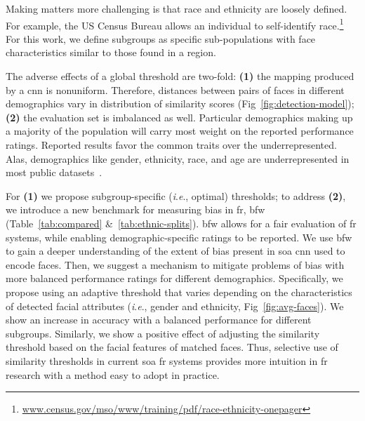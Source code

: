 \documentclass[10pt,twocolumn,letterpaper]{article}
\newcommand{\ie}{\textit{i}.\textit{e}., }
\begin{document}
\begin{table}[!t]
{{\begin{tabular}{r c c c c c c c c l}
        \bottomrule
    \end{tabular}}
    }
\end{table}

    
    Making matters more challenging is that race and ethnicity are loosely defined. For example, the US Census Bureau allows an individual to self-identify race.\footnote{\scriptsize\href{https://www.census.gov/mso/www/training/pdf/race-ethnicity-onepager.pdf}{www.census.gov/mso/www/training/pdf/race-ethnicity-onepager}} For this work, we define subgroups as specific sub-populations with face characteristics similar to those found in a region. 
    
    
    The adverse effects of a global threshold are two-fold: \textbf{(1)} the mapping produced by a \gls{cnn} is nonuniform. Therefore, distances between pairs of faces in different demographics vary in distribution of similarity scores (Fig~\ref{fig:detection-model}); \textbf{(2)} the evaluation set is imbalanced as well. Particular demographics making up a majority of the population will carry most weight on the reported performance ratings. Reported results favor the common traits over the underrepresented. Alas, demographics like gender, ethnicity, race, and age are underrepresented in most public datasets~\cite{merler2019diversity, wang2018racial}. 
    
    
    For \textbf{(1)} we propose subgroup-specific (\ie optimal) thresholds; to address \textbf{(2)}, we introduce a new benchmark for measuring bias in \gls{fr}, \gls{bfw} (Table~\ref{tab:compared} \&~\ref{tab:ethnic-splits}). \gls{bfw} allows for a fair evaluation of \gls{fr} systems, while enabling demographic-specific ratings to be reported. We use \gls{bfw} to gain a deeper understanding of the extent of bias present in \gls{soa} \gls{cnn} used to encode faces. Then, we suggest a mechanism to mitigate problems of bias with more balanced performance ratings for different demographics. Specifically, we propose using an adaptive threshold that varies depending on the characteristics of detected facial attributes (\ie gender and ethnicity, Fig~\ref{fig:avg-faces}). We show an increase in accuracy with a balanced performance for different subgroups. Similarly, we show a positive effect of adjusting the similarity threshold based on the facial features of matched faces. Thus, selective use of similarity thresholds in current \gls{soa} \gls{fr} systems provides more intuition in \gls{fr} research with a method easy to adopt in practice. 
    
\end{document}
